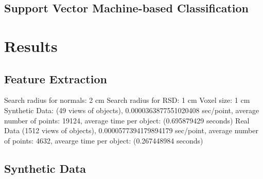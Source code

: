 \documentclass[conference]{sty/IEEEtran}
\begin{document}
\subsection{Support Vector Machine-based Classification}

\section{Results}
\label{sec:results}
\subsection{Feature Extraction}
Search radius for normals: 2 cm
Search radius for RSD: 1 cm
Voxel size: 1 cm
Synthetic Data: (49 views of objects), 0.0000363877551020408 sec/point, average number of points: 19124, average time per object: (0.695879429 seconds)
Real Data (1512 views of objects), 0.0000577394179894179  sec/point,  average number of points: 4632, avearge time per object: (0.267448984 seconds)

\subsection{Synthetic Data}
\end{document}
